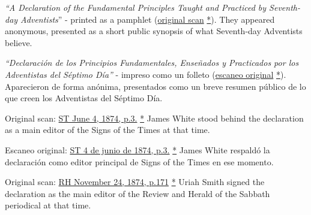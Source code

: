 



\textit{“A Declaration of the Fundamental Principles Taught and Practiced by Seventh-day Adventists}” - printed as a pamphlet (\href{https://adventistdigitallibrary.org/islandora/object/adl:366607?link_only=true}{original scan} \href{https://forgotten-pillar.s3.us-east-2.amazonaws.com/A+declaration+of+the+fundamental+principles+taught+and+practiced+by+the+Seventh-day+Adventists++.pdf}{*}). They appeared anonymous, presented as a short public synopsis of what Seventh-day Adventists believe.


\textit{“Declaración de los Principios Fundamentales, Enseñados y Practicados por los Adventistas del Séptimo Día”} - impreso como un folleto (\href{https://adventistdigitallibrary.org/islandora/object/adl:366607?link_only=true}{escaneo original} \href{https://forgotten-pillar.s3.us-east-2.amazonaws.com/A+declaration+of+the+fundamental+principles+taught+and+practiced+by+the+Seventh-day+Adventists++.pdf}{*}). Aparecieron de forma anónima, presentados como un breve resumen público de lo que creen los Adventistas del Séptimo Día.






Original scan: \href{https://adventistdigitallibrary.org/adl-364148/signs-times-june-4-1874}{ST June 4, 1874, p.3.} \href{https://forgotten-pillar.s3.us-east-2.amazonaws.com/Signs+of+the+Times+_+June+4%2C+1874++.pdf}{*} James White stood behind the declaration as a main editor of the Signs of the Times at that time.


Escaneo original: \href{https://adventistdigitallibrary.org/adl-364148/signs-times-june-4-1874}{ST 4 de junio de 1874, p.3.} \href{https://forgotten-pillar.s3.us-east-2.amazonaws.com/Signs+of+the+Times+_+June+4%2C+1874++.pdf}{*} James White respaldó la declaración como editor principal de Signs of the Times en ese momento.






Original scan: \href{https://documents.adventistarchives.org/Periodicals/RH/RH18741124-V44-22.pdf}{RH November 24, 1874, p.171} \href{https://forgotten-pillar.s3.us-east-2.amazonaws.com/RH18741124-V44-22.pdf}{*} Uriah Smith signed the declaration as the main editor of the Review and Herald of the Sabbath periodical at that time.


